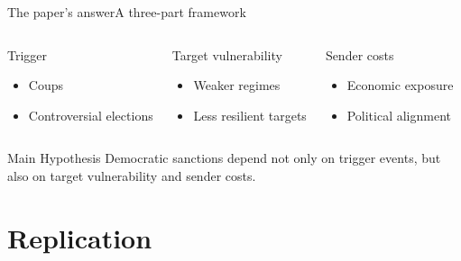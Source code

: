 \documentclass[
11pt,notheorems,hyperref={pdfauthor=Jakob}
]{beamer}
\begin{document}
\begin{frame}{The paper's answer}{A three-part framework}
	\begin{columns}[T,onlytextwidth]
		\begin{block}{Trigger}
			\begin{itemize}
				\item Coups
				\item Controversial elections
			\end{itemize}
		\end{block}
		
		\begin{block}{Target vulnerability}
			\begin{itemize}
				\item Weaker regimes
				\item Less resilient targets
			\end{itemize}
		\end{block}
		
		\begin{block}{Sender costs}
			\begin{itemize}
				\item Economic exposure
				\item Political alignment
			\end{itemize}
		\end{block}
	\end{columns}
	
	\vspace{0.5em}
	
	\begin{exampleblock}{Main Hypothesis}
		Democratic sanctions depend not only on trigger events, but also on target vulnerability and sender costs.
	\end{exampleblock}
\end{frame}
	
	\section{Replication}
	
\end{document}
